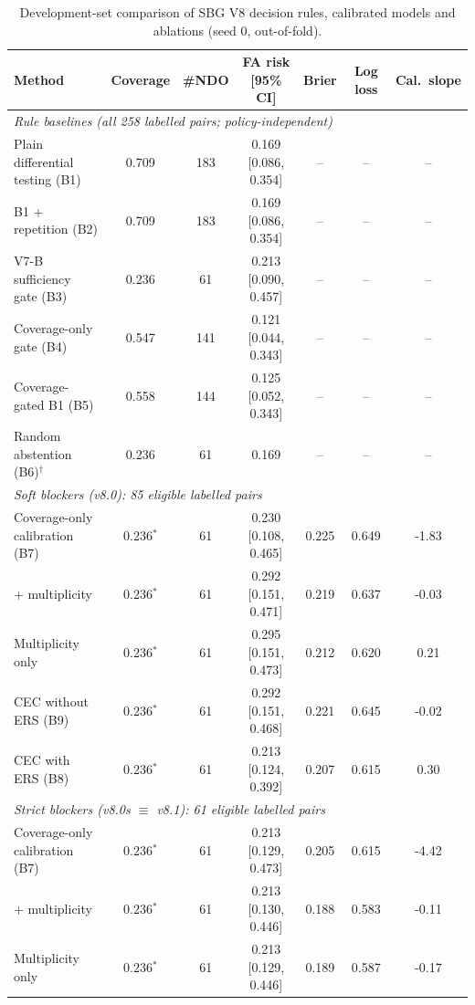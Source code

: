 \begin{table}[!t]
\caption{Development-set comparison of SBG V8 decision rules, calibrated models and ablations (seed 0, out-of-fold).}
\label{tab:ablation}
\centering
\footnotesize
\begin{tabular}{|l|c|c|c|c|c|c|}
\hline
Method & Coverage & \#NDO & FA risk [95\% CI] & Brier & Log loss & Cal.\ slope \\
\hline
\multicolumn{7}{l}{\emph{Rule baselines (all 258 labelled pairs; policy-independent)}} \\
Plain differential testing (B1) & 0.709 & 183 & 0.169 [0.086, 0.354] & -- & -- & -- \\
B1 + repetition (B2) & 0.709 & 183 & 0.169 [0.086, 0.354] & -- & -- & -- \\
V7-B sufficiency gate (B3) & 0.236 & 61 & 0.213 [0.090, 0.457] & -- & -- & -- \\
Coverage-only gate (B4) & 0.547 & 141 & 0.121 [0.044, 0.343] & -- & -- & -- \\
Coverage-gated B1 (B5) & 0.558 & 144 & 0.125 [0.052, 0.343] & -- & -- & -- \\
Random abstention (B6)$^\dagger$ & 0.236 & 61 & 0.169 & -- & -- & -- \\
\hline
\multicolumn{7}{l}{\emph{Soft blockers (v8.0): 85 eligible labelled pairs}} \\
Coverage-only calibration (B7) & 0.236$^\ast$ & 61 & 0.230 [0.108, 0.465] & 0.225 & 0.649 & -1.83 \\
\quad + multiplicity & 0.236$^\ast$ & 61 & 0.292 [0.151, 0.471] & 0.219 & 0.637 & -0.03 \\
Multiplicity only & 0.236$^\ast$ & 61 & 0.295 [0.151, 0.473] & 0.212 & 0.620 & 0.21 \\
CEC without ERS (B9) & 0.236$^\ast$ & 61 & 0.292 [0.151, 0.468] & 0.221 & 0.645 & -0.02 \\
CEC with ERS (B8) & 0.236$^\ast$ & 61 & 0.213 [0.124, 0.392] & 0.207 & 0.615 & 0.30 \\
\hline
\multicolumn{7}{l}{\emph{Strict blockers (v8.0s $\equiv$ v8.1): 61 eligible labelled pairs}} \\
Coverage-only calibration (B7) & 0.236$^\ast$ & 61 & 0.213 [0.129, 0.473] & 0.205 & 0.615 & -4.42 \\
\quad + multiplicity & 0.236$^\ast$ & 61 & 0.213 [0.130, 0.446] & 0.188 & 0.583 & -0.11 \\
Multiplicity only & 0.236$^\ast$ & 61 & 0.213 [0.129, 0.446] & 0.189 & 0.587 & -0.17 \\

\end{tabular}
\end{table}
